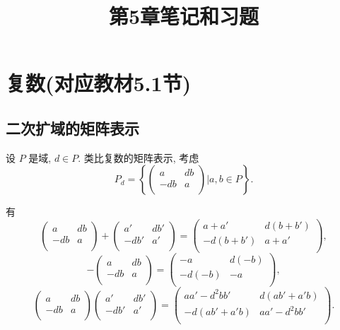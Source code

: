 \documentclass[UTF8]{ctexart}
\title{第5章笔记和习题}
\begin{document}
\maketitle
\section{复数(对应教材5.1节)}
\subsection{二次扩域的矩阵表示}
设 $P$ 是域, $d\in P$. 类比复数的矩阵表示, 考虑
\[P_d=\left\{\begin{pmatrix}
    a & db \\
    -db & a \\
\end{pmatrix}\Bigg|a,b\in P\right\}.\]

有
\[\begin{pmatrix}
    a & db \\
    -db & a \\
\end{pmatrix}+\begin{pmatrix}
    a' & db' \\
    -db' & a' \\
\end{pmatrix}=\begin{pmatrix}
    a+a' & d(b+b') \\
    -d(b+b') & a+a' \\
\end{pmatrix},\]
\[-\begin{pmatrix}
    a & db \\
    -db & a \\
\end{pmatrix}=\begin{pmatrix}
    -a & d(-b) \\
    -d(-b) & -a \\
\end{pmatrix},\]
\[\begin{pmatrix}
    a & db \\
    -db & a \\
\end{pmatrix}\begin{pmatrix}
    a' & db' \\
    -db' & a' \\
\end{pmatrix}=\begin{pmatrix}
    aa'-d^2bb' & d(ab'+a'b) \\
    -d(ab'+a'b) & aa'-d^2bb' \\
\end{pmatrix}.\]
\end{document}
